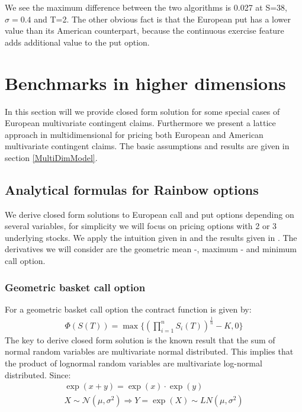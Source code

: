 We see the maximum difference between the two algorithms is 0.027 at S=38, $\sigma=0.4$ and T=2. The other obvious fact is that the European put has a lower value than its American counterpart, because the continuous exercise feature adds additional value to the put option. 



\section{Benchmarks in higher dimensions}\label{BMHiggerDim}
In this section will we provide closed form solution for some special cases of European multivariate contingent claims. Furthermore we present a lattice approach in multidimensional for pricing both European and American multivariate contingent claims. The basic assumptions and results are given in section \ref{MultiDimModel}.

\subsection{Analytical formulas for Rainbow options}
We derive closed form solutions to European call and put options depending on several variables, for simplicity we will focus on pricing options with 2 or 3 underlying stocks. We apply the intuition given in \parencite{Johnson87} and the results given in \parencite{Ouwehand2006}. The derivatives we will consider are the geometric mean -, maximum - and minimum call option.

\subsubsection{Geometric basket call option}
For a geometric basket call option the contract function is given by:
\begin{align*}
\Phi(S(T))=\max\{ (\prod_{i=1}^{n} S_i(T))^{\frac{1}{n}}-K,0 \}
\end{align*}
The key to derive closed form solution is the known result that the sum of normal random variables are multivariate normal distributed.
This implies that the product of lognormal random variables are multivariate log-normal distributed. Since: 
\begin{equation*}
\begin{split}
\exp(x+y)=\exp(x)\cdot \exp(y) \\
X \sim \mathcal{N}(\mu,\sigma^2) \Rightarrow Y = \exp(X)\sim LN(\mu, \sigma^2)
\end{split}
\end{equation*}

